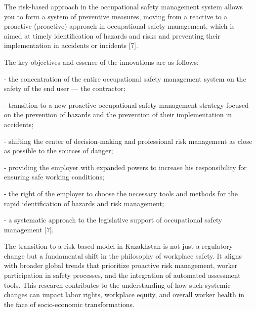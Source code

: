 \begin{multicols}{2}
The risk-based approach in the occupational safety management system
allows you to form a system of preventive measures, moving from a
reactive to a proactive (proactive) approach in occupational safety
management, which is aimed at timely identification of hazards and risks
and preventing their implementation in accidents or incidents {[}7{]}.

The key objectives and essence of the innovations are as follows:

- the concentration of the entire occupational safety management system
on the safety of the end user --- the contractor;

- transition to a new proactive occupational safety management strategy
focused on the prevention of hazards and the prevention of their
implementation in accidents;

- shifting the center of decision-making and professional risk
management as close as possible to the sources of danger;

- providing the employer with expanded powers to increase his
responsibility for ensuring safe working conditions;

- the right of the employer to choose the necessary tools and methods
for the rapid identification of hazards and risk management;

- a systematic approach to the legislative support of occupational
safety management {[}7{]}.

The transition to a risk-based model in Kazakhstan is not just a
regulatory change but a fundamental shift in the philosophy of workplace
safety. It aligns with broader global trends that prioritize proactive
risk management, worker participation in safety processes, and the
integration of automated assessment tools. This research contributes to
the understanding of how such systemic changes can impact labor rights,
workplace equity, and overall worker health in the face of
socio-economic transformations.


\end{multicols}
